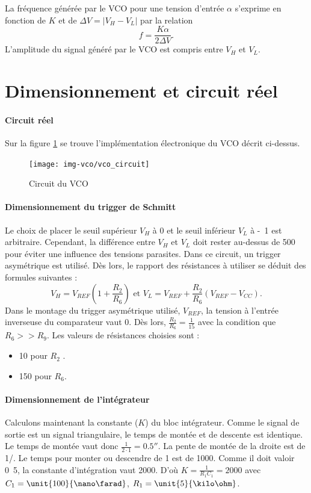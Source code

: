 La fréquence générée par le VCO pour une tension d'entrée $\alpha$ s'exprime 
en fonction de $K$ et de $\Delta V = \vert V_H - V_L\vert $ par la relation 
\[ f = \frac{K\alpha}{2\Delta V}. \]
L'amplitude du signal généré par le VCO est compris entre $V_H$ et $V_L$.


\section{Dimensionnement et circuit réel}
\paragraph{Circuit réel}
Sur la figure \ref{fig:circuit_vco} se trouve l'implémentation électronique du VCO décrit ci-dessus.

\begin{figure}[ht]
	\centering
	\texttt{[image: img-vco/vco\_circuit]}
	\caption{Circuit du VCO}
	\label{fig:circuit_vco}
\end{figure}

\paragraph{Dimensionnement du trigger de Schmitt}
Le choix de placer le seuil supérieur $V_H$ à \unit{0}{\volt} 
et le seuil inférieur $V_L$ à \unit{-1}{\volt} est arbitraire. 
Cependant, la différence entre $V_H$ et $V_L$ doit rester au-dessus
de \unit{500}{\milli\volt} pour éviter une influence des tensions parasites.
Dans ce circuit, un trigger asymétrique est utilisé. Dès lors, le rapport
des résistances à utiliser se déduit des formules suivantes : 
\[ V_H = V_{REF}\left(1+\frac{R_2}{R_6}\right) \text{ et } V_L = V_{REF} + \frac{R_2}{R_6}\left(V_{REF}-V_{CC}\right). \]
Dans le montage du trigger asymétrique utilisé, $V_{REF}$, la tension à l'entrée
inverseuse du comparateur vaut \unit{0}{\volt}. Dès lors, $\frac{R_2}{R_6}=\frac{1}{15}$
avec la condition que $R_6 >> R_9$. Les valeurs de résistances choisies sont :

\begin{itemize}
	\item \unit{10}{\kilo\ohm} pour $R_2$ .
	\item \unit{150}{\kilo\ohm} pour $R_6$.
\end{itemize}

\paragraph{Dimensionnement de l'intégrateur}
Calculons maintenant la constante ($K$) du bloc intégrateur. 
Comme le signal de sortie est un signal triangulaire, le temps de montée et de descente est 
identique. Le temps de montée vaut donc $\frac{1}{2\cdot1} = \unit{0.5}{\second}$. 
La pente de montée de la droite est de \unit{1}{\milli\volt}/\unit{}{\second}. 
Le temps pour monter ou descendre de \unit{1}{\volt} est de \unit{1000}{\second}. 
Comme il doit valoir \unit{0.5}{\second}, la constante d'intégration vaut 2000. D'où 
$K=\frac{1}{R_1C_1} = 2000$ avec $C_1= \unit{100}{\nano\farad}$, $R_1 = \unit{5}{\kilo\ohm}$.
